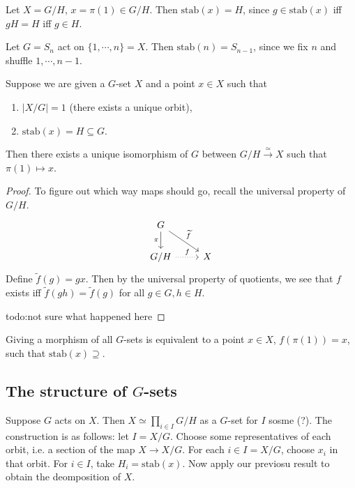 \begin{example}
    Let $X=G/H$, $x = \pi(1) \in G /H$. Then $\mathrm{stab}(x)=H$, since $g \in \mathrm{stab}(x) $ iff $gH=H$ iff $g \in H$.
\end{example}
\begin{example}
    Let $G=S_n $ act on $\{1,\cdots ,n\} =X$. Then $\mathrm{stab}(n)=S _{n-1}$, since we fix $n$ and shuffle $1,\cdots ,n-1$.
\end{example}
\begin{lemma}
    Suppose we are given a $G$-set $X$ and a point $x \in X$ such that 
    \begin{enumerate}[label=(\alph*)]
    \setlength\itemsep{-.2em}
\item $| X / G| =1$ (there exists a unique orbit),
\item $\mathrm{stab}(x)=H \subseteq G$.
    \end{enumerate}
    Then there exists a unique isomorphism of $G$ between $G / H \xrightarrow{\simeq } X$ such that $\pi(1) \mapsto x$.
\end{lemma}
\begin{proof}
     To figure out which way maps should go, recall the universal property of $G /H$.\[
     \begin{tikzcd}
G \arrow[d, "\pi"'] \arrow[rd, "\widetilde f"] &   \\
G/H \arrow[r, "f", dotted]                     & X
\end{tikzcd}
\] Define $\widetilde f(g)= gx$. Then by the universal property of quotients, we see that $f$ exists iff $\widetilde f(gh)= \widetilde f(g)$ for all $g \in G, h\in H$.

{\color{red}todo:not sure what happened here} 
\end{proof}

\begin{lemma}
    Giving a morphism of all $G$-sets is equivalent to a point $x \in X$, $f(\pi(1))=x$, such that $\mathrm{stab}(x) \supseteq$.
\end{lemma}

\subsection{The structure of $G$-sets}
Suppose $G$ acts on $X$. Then $X \simeq  \prod _{ i \in I}G / H$ as a $G$-set for $I$ sosme (?). The construction is as follows: let $I= X /G$. Choose some representatives of each orbit, i.e. a section of the map $X \to  X / G$. For each $i \in I=X /G$, choose $x _i $ in that orbit. For $i \in I$, take $H_i = \mathrm{stab}(x)$. Now apply our previosu result to obtain the deomposition of $X$.
